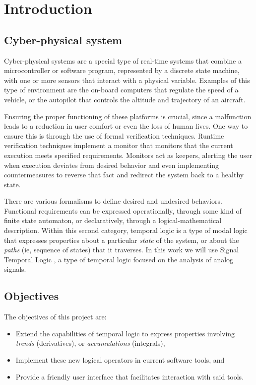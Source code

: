 \chapter{Introduction}

\section{Cyber-physical system}
Cyber-physical systems are a special type of real-time systems that combine a microcontroller or software program, represented by a discrete state machine, with one or more sensors that interact with a physical variable. Examples of this type of environment are the on-board computers that regulate the speed of a vehicle, or the autopilot that controls the altitude and trajectory of an aircraft.

Ensuring the proper functioning of these platforms is crucial, since a malfunction leads to a reduction in user comfort or even the loss of human lives. One way to ensure this is through the use of formal verification techniques. Runtime verification techniques \cite{STTT_RV_21} implement a monitor that monitors that the current execution meets specified requirements. Monitors act as keepers, alerting the user when execution deviates from desired behavior and even implementing countermeasures to reverse that fact and redirect the system back to a healthy state.

There are various formalisms to define desired and undesired behaviors. Functional requirements can be expressed operationally, through some kind of finite state automaton, or declaratively, through a logical-mathematical description. Within this second category, temporal logic is a type of modal logic that expresses properties about a particular \emph{state} of the system, or about the \emph{paths} (ie, sequence of states) that it traverses. In this work we will use Signal Temporal Logic \cite{STL}, a type of temporal logic focused on the analysis of analog signals.

\section{Objectives}

The objectives of this project are:

\begin{itemize}
\item Extend the capabilities of temporal logic to express properties involving \textit{trends} (derivatives), or \textit{accumulations} (integrals), 
\item Implement these new logical operators in current software tools, and
\item Provide a friendly user interface that facilitates interaction with said tools.
\end{itemize}


